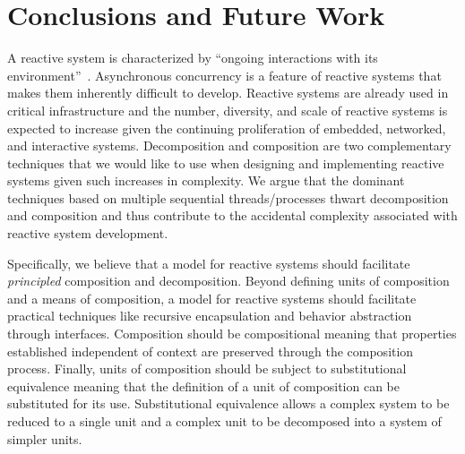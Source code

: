 \chapter{Conclusions and Future Work}
\label{conclusion}

A reactive system is characterized by ``ongoing interactions with its environment''~\cite{manna1992temporal}.
Asynchronous concurrency is a feature of reactive systems that makes them inherently difficult to develop.
Reactive systems are already used in critical infrastructure and the number, diversity, and scale of reactive systems is expected to increase given the continuing proliferation of embedded, networked, and interactive systems.
Decomposition and composition are two complementary techniques that we would like to use when designing and implementing reactive systems given such increases in complexity.
We argue that the dominant techniques based on multiple sequential threads/processes thwart decomposition and composition and thus contribute to the accidental complexity associated with reactive system development.

Specifically, we believe that a model for reactive systems should facilitate \emph{principled} composition and decomposition.
Beyond defining units of composition and a means of composition, a model for reactive systems should facilitate practical techniques like recursive encapsulation and behavior abstraction through interfaces.
Composition should be compositional meaning that properties established independent of context are preserved through the composition process.
Finally, units of composition should be subject to substitutional equivalence meaning that the definition of a unit of composition can be substituted for its use.
Substitutional equivalence allows a complex system to be reduced to a single unit and a complex unit to be decomposed into a system of simpler units.

